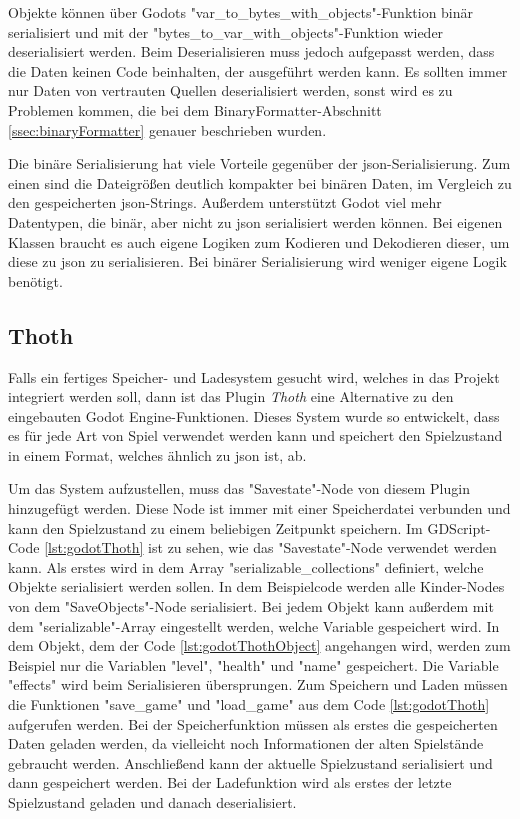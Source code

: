 Objekte können über Godots "var\_to\_bytes\_with\_objects"-Funktion binär serialisiert und mit der "bytes\_to\_var\_with\_objects"-Funktion wieder deserialisiert werden. Beim Deserialisieren muss jedoch aufgepasst werden, dass die Daten keinen Code beinhalten, der ausgeführt werden kann. Es sollten immer nur Daten von vertrauten Quellen deserialisiert werden, sonst wird es zu Problemen kommen, die bei dem BinaryFormatter-Abschnitt \ref{ssec:binaryFormatter} genauer beschrieben wurden.\cite{godotengineGlobalScope}

Die binäre Serialisierung hat viele Vorteile gegenüber der \ac{json}-Serialisierung. Zum einen sind die Dateigrößen deutlich kompakter bei binären Daten, im Vergleich zu den gespeicherten \ac{json}-Strings. Außerdem unterstützt Godot viel mehr Datentypen, die binär, aber nicht zu \ac{json} serialisiert werden können. Bei eigenen Klassen braucht es auch eigene Logiken zum Kodieren und Dekodieren dieser, um diese zu \ac{json} zu serialisieren. Bei binärer Serialisierung wird weniger eigene Logik benötigt.\cite{godotengineSavingGames}



\subsection{Thoth}
Falls ein fertiges Speicher- und Ladesystem gesucht wird, welches in das Projekt integriert werden soll, dann ist das Plugin \textit{Thoth} eine Alternative zu den eingebauten Godot Engine-Funktionen. Dieses System wurde so entwickelt, dass es für jede Art von Spiel verwendet werden kann und speichert den Spielzustand in einem Format, welches ähnlich zu \ac{json} ist, ab.\cite{stupidratstudioGodotSaveLoad}

Um das System aufzustellen, muss das "Savestate"-Node von diesem Plugin hinzugefügt werden. Diese Node ist immer mit einer Speicherdatei verbunden und kann den Spielzustand zu einem beliebigen Zeitpunkt speichern. Im GDScript-Code \ref{lst:godotThoth} ist zu sehen, wie das "Savestate"-Node verwendet werden kann. Als erstes wird in dem Array "serializable\_collections" definiert, welche Objekte serialisiert werden sollen. In dem Beispielcode werden alle Kinder-Nodes von dem "SaveObjects"-Node serialisiert. Bei jedem Objekt kann außerdem mit dem "serializable"-Array eingestellt werden, welche Variable gespeichert wird. In dem Objekt, dem der Code \ref{lst:godotThothObject} angehangen wird, werden zum Beispiel nur die Variablen "level", "health" und "name" gespeichert. Die Variable "effects" wird beim Serialisieren übersprungen. Zum Speichern und Laden müssen die Funktionen "save\_game" und "load\_game" aus dem Code \ref{lst:godotThoth} aufgerufen werden. Bei der Speicherfunktion müssen als erstes die gespeicherten Daten geladen werden, da vielleicht noch Informationen der alten Spielstände gebraucht werden. Anschließend kann der aktuelle Spielzustand serialisiert und dann gespeichert werden. Bei der Ladefunktion wird als erstes der letzte Spielzustand geladen und danach deserialisiert.\cite{stupidratstudioGodotSaveLoad} 

